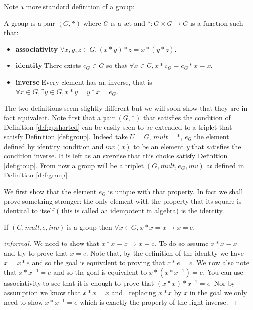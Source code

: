 Note a more standard definition of a group:
\begin{definition}\label{def:gpshorted}
A group is a pair $(G, *)$ where $G$ is a set and $*:G\times G \rightarrow G$ is a function such that:\
\begin{itemize}
\item {\bf associativity} $\forall x, y,z \in G, (x * y) * z = x* (y*z)$.
\item {\bf identity} There exists $e_{G}\in G$ so that $\forall x \in G, x* e_{G}= e_{G}*x = x$.
\item {\bf inverse} Every element has an inverse, that is $\forall x \in G, \exists y \in G, x*y = y*x =e_{G}$.
\end{itemize}

\end{definition}

The two definitions seem slightly different but we will soon show that they are in fact equivalent. Note first that a pair $(G,*)$ that satisfies the condition of Definition \ref{def:gpshorted} can be easily seen to be extended to a triplet that satisfy Definition \ref{def:group}. Indeed take $U=G$, $mult = *$, $e_{G}$ the element defined by identity condition and $inv(x)$ to be an element $y$ that satisfies the condition inverse. It is left as an exercise that this choice satisfy Definition \ref{def:group}. From now  a group will be a triplet $(G, mult, e_{G}, inv)$ as defined in Definition \ref{def:group}.

We first show that the element $e_{G}$ is unique with that property. In fact we shall prove something stronger: the only  element with  the property that its square is identical to itself ( this is called an idempotent in algebra) is the identity.

\begin{lemma}\label{leminf:unituniq}
If $(G, mult, e, inv)$ is a group then $\forall x \in G, x* x = x \rightarrow x=e$.
 \end{lemma}
\begin{proof}[informal]
We need to show that $x*x = x \rightarrow x =e$. To do so assume $x*x=x$ and  try to prove that $x=e$. Note that, by the definition of the identity we have $x= x*e$ and so the goal is equivalent to proving that $x * e = e$. We now also note that $x*x^{-1}= e$ and so the goal is equivalent to $x* (x* x^{-1}) = e$. You can use associativity to see that it is enough to prove that $(x*x)* x^{-1} =e$. Nor by assumption we know that $x*x =x$ and , replacing $x*x$ by $x$  in the goal we only need to show $x*x^{-1}= e$ which is exactly the property of the right inverse.
\end{proof}

